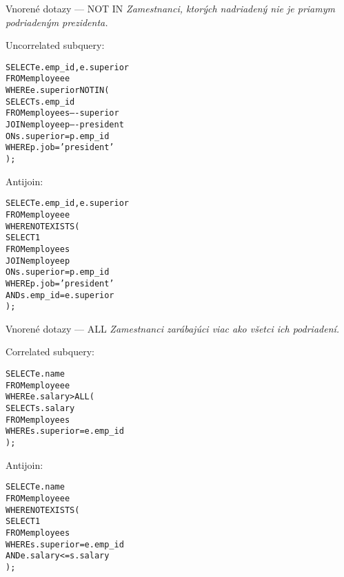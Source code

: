 \documentclass[12pt]{beamer}
\def\blue#1{\textcolor{Cerulean}{#1}}
\begin{document}
\begin{frame}[fragile]{Vnorené dotazy --- NOT IN}
\footnotesize
\emph{Zamestnanci, ktorých nadriadený nie je priamym podriadeným prezidenta.}\\[7mm]
\begin{minipage}{.4\pdfpagewidth}
\alert{Un}correlated subquery:
\footnotesize
\begin{alltt}
SELECT e.emp_id, e.superior
FROM employee e
WHERE \blue{e.superior NOT IN} (
  SELECT \blue{s.emp_id}
  FROM employee s ----superior
  JOIN employee p ----president
    ON s.superior = p.emp_id
  WHERE p.job = 'president'
);

\end{alltt}
\end{minipage}
\hfill\vline\hfill
\begin{minipage}{.4\pdfpagewidth}
Antijoin:
\footnotesize
\begin{alltt}
SELECT e.emp_id, e.superior
FROM employee e
WHERE \blue{NOT EXISTS} (
  SELECT 1
  FROM employee s
  JOIN employee p
    ON s.superior = p.emp_id
  WHERE p.job = 'president'
    \blue{AND s.emp_id = e.superior}
);
\end{alltt}
\end{minipage}
\end{frame}

\begin{frame}[fragile]{Vnorené dotazy --- ALL}
\footnotesize
\emph{Zamestnanci zarábajúci viac ako všetci ich podriadení.}\\[7mm]
\begin{minipage}{.4\pdfpagewidth}
Correlated subquery:
\footnotesize
\begin{alltt}
SELECT e.name
FROM employee e
WHERE e.salary > \blue{ALL} (
  SELECT s.salary
  FROM employee s
  WHERE s.superior = e.emp_id
);

\end{alltt}
\end{minipage}
\hfill\vline\hfill
\begin{minipage}{.4\pdfpagewidth}
Antijoin:
\footnotesize
\begin{alltt}
SELECT e.name
FROM employee e
WHERE NOT EXISTS (
  SELECT 1
  FROM employee s
  WHERE s.superior = e.emp_id
  AND e.salary <= s.salary
);
\end{alltt}
\end{minipage}
\end{frame}
\end{document}
